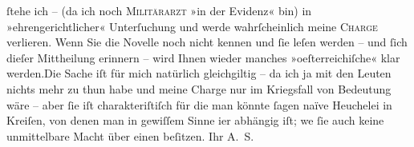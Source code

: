 \begin{ledgroupsized}[t]{13cm}
                        ſtehe ich – (da ich noch \textsc{Militärarzt} »in der
                        Evidenz« bin) in »ehrengerichtlicher« Unterſuchung und werde wahrſcheinlich
                        meine \textsc{Charge} verlieren. Wenn Sie die Novelle {\pb}noch nicht kennen und ſie leſen werden –
                        und ſich dieſer Mittheilung erinnern – wird Ihnen wieder manches »oeſterreichiſche« klar werden.\hspace*{1.5em}Die Sache iſt für mich natürlich gleichgiltig
                        – da ich ja mit den Leuten nichts mehr zu thun habe und meine Charge nur im
                        Kriegsfall von Bedeutung wäre – aber ſie iſt charakteriſtiſch für {\pb}die man könnte ſagen naïve Heuchelei in
                        Kreiſen, von denen man in gewiſſem Sinne i{\geminationm}er
                        abhängig iſt; we{\geminationn}{ }ſie auch keine unmittelbare Macht über
                        einen beſitzen.\pend
           \pstart
           Ihr \spacefill\mbox{A. S.}\pend
           \endnumbering{}\end{ledgroupsized}  \newcommand{\dateiname}{L01114}\newcommand{\titel}{Arthur Schnitzler an Georg Brandes, 25. 4. 1901}\newcommand{\editorInnen}{Martin Anton Müller und Gerd-Hermann Susen}
      